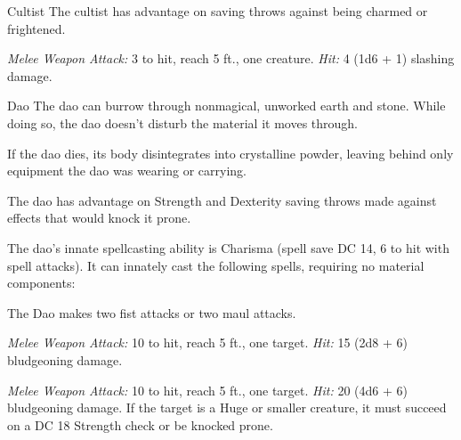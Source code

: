 \documentclass[10pt,a4paper,twoside,bg=print,twocolumn,openany,nodeprecatedcode]{dndbook}
\begin{document}
\begin{DndMonster}[float=t]{Cultist}
\DndMonsterBasics[
armor-class = {12 (\textit{leather armor})},
hit-points = {\DndDice{2d8}},
speed = {30 ft.}
]
\DndMonsterAbilityScores[
 str = 11,
 dex = 12,
 con = 10,
 int = 10,
 wis = 11,
 cha = 10
]
\DndMonsterDetails[
skills = {Deception +2, Religion +2},
languages = {any one language (usually Common)},
challenge = 1/8,
]
The cultist has advantage on saving throws against being charmed or frightened.

\textsl{Melee Weapon Attack:} 3 to hit, reach 5 ft., one creature. \textsl{Hit:} 4 (1d6 + 1) slashing damage.

\end{DndMonster}



\begin{DndMonster}[float=t]{Dao}
\DndMonsterBasics[
armor-class = {18 (natural armor)},
hit-points = {\DndDice{15d10 + 105}},
speed = {30 ft., burrow 30 ft., fly 30 ft.}
]
\DndMonsterAbilityScores[
 str = 23,
 dex = 12,
 con = 24,
 int = 12,
 wis = 13,
 cha = 14
]
\DndMonsterDetails[
saving-throws = {Int +5, Wis +5, Cha +6},
condition-immunities = {petrified},
senses = {darkvision 120 ft., passive perception 11},
languages = {Terran},
challenge = 11,
]
The dao can burrow through nonmagical, unworked earth and stone. While doing so, the dao doesn't disturb the material it moves through.

If the dao dies, its body disintegrates into crystalline powder, leaving behind only equipment the dao was wearing or carrying.

The dao has advantage on Strength and Dexterity saving throws made against effects that would knock it prone.

The dao's innate spellcasting ability is Charisma (spell save DC 14, 6 to hit with spell attacks). It can innately cast the following spells, requiring no material components:
\begin{DndMonsterSpells}
\end{DndMonsterSpells}
The Dao makes two fist attacks or two maul attacks.

\textsl{Melee Weapon Attack:} 10 to hit, reach 5 ft., one target. \textsl{Hit:} 15 (2d8 + 6) bludgeoning damage.

\textsl{Melee Weapon Attack:} 10 to hit, reach 5 ft., one target. \textsl{Hit:} 20 (4d6 + 6) bludgeoning damage. If the target is a Huge or smaller creature, it must succeed on a DC 18 Strength check or be knocked prone.

\end{DndMonster}
\end{document}
